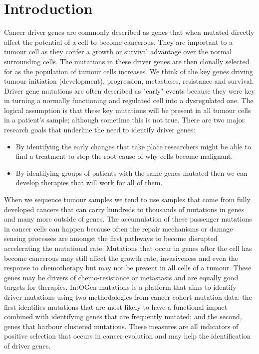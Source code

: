 \section{Introduction}
Cancer driver genes are commonly described as genes that when mutated directly affect
the potential of a cell to become cancerous. They are important to a tumour cell as they
confer a growth or survival advantage over the normal surrounding cells. The mutations
in these driver genes are then clonally selected for as the population of tumour cells
increases. We think of the key genes driving tumour initiation (development), progression,
metastases, resistance and survival. Driver gene mutations are often described as "early"
events because they were key in turning a normally functioning and regulated cell into a
dysregulated one. The logical assumption is that these key mutations will be present in
all tumour cells in a patient's sample; although sometime this is not true.
\vspace{4 mm]}
There are two major research goals that underline the need to identify driver genes:
\begin{itemize}
 \item By identifying the early changes that take place researchers might be able
        to find a treatment to stop the root cause of why cells become malignant. 
\item By identifying groups of patients with the same genes mutated then we can
        develop therapies that will work for all of them.
\end{itemize}
\vspace{4 mm]}
When we sequence tumour samples we tend to use samples that come from fully developed
cancers that can carry hundreds to thousands of mutations in genes and many more outside
of genes. The accumulation of these passenger mutations in cancer cells can happen
because often the repair mechanisms or damage sensing processes are amongst the first
pathways to become disrupted accelerating the mutational rate. Mutations that occur in
genes after the cell has become cancerous may still affect the growth rate, invasiveness
and even the response to chemotherapy but may not be present in all cells of a tumour.
These genes may be drivers of chemo-resistance or metastasis and are equally good targets
for therapies.
\vspace{4 mm]}
IntOGen-mutations is a platform that aims to identify driver mutations using two
methodologies from cancer cohort mutation data: the first identifies mutations that
are most likely to have a functional impact combined with identifying  genes that are
frequently mutated; and the second, genes that harbour clustered mutations. These measures
are all indicators of positive selection that occurs in cancer evolution and may help
the identification of driver genes.


